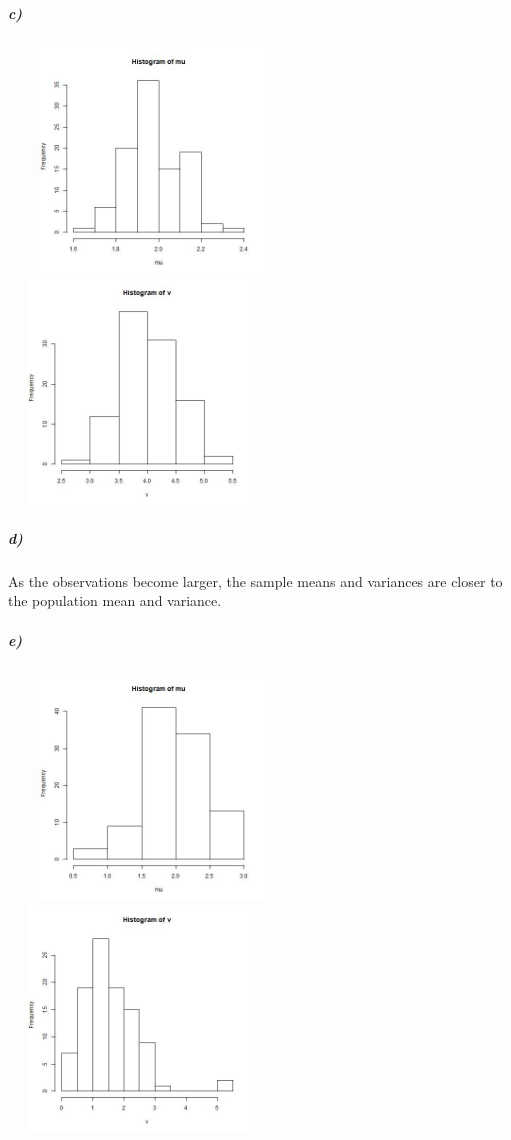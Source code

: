 \documentclass{article}
\begin{document}
\subparagraph{c)}~{}
\newline
\includegraphics[height=6cm,width=7cm]{2cmean.jpg}
\includegraphics[height=6cm,width=7cm]{2cvar.jpg}
\subparagraph{d)}
As the observations become larger, the sample means and variances are closer to the population mean and variance.
\subparagraph{e)}~{}
\newline
\includegraphics[height=6cm,width=7cm]{2emean.jpg}
\includegraphics[height=6cm,width=7cm]{2evar.jpg}
\end{document}
